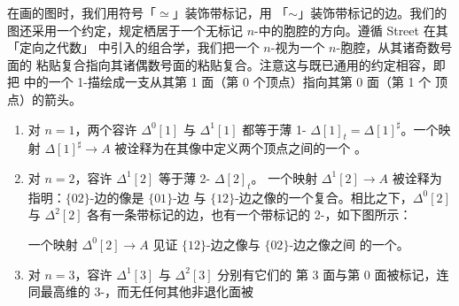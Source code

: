 在画\trMarkedSimplicialSet{}的图时，我们用符号「$\simeq$」装饰带标记\trSimplex{}，用
「$\sim$」装饰带标记的边。我们的图还采用一个约定，规定栖居于一个无标记
$n$-\trSimplex{}中的胞腔的方向。遵循 Street 在其「定向\trSimplex{}之代数」\cite{bib120}
中引入的组合学，我们把一个 $n$-\trSimplex{}视为一个 $n$-胞腔，从其诸奇数号面的
粘贴复合指向其诸偶数号面的粘贴复合。注意这与既已通用的约定相容，即把\trSimplicialSet{}%
中的一个 1-\trSimplex{}描绘成一支从其第 1 面（第 0 个顶点）指向其第 0 面（第 1 个
顶点）的箭头。

\begin{example}\label{exa:admissible-low-dimensions}
\begin{enumerate}[label=(\roman*)]
\item 对 $n=1$，两个容许\trSimplex{} $\Delta^{0}[1]$ 与 $\Delta^{1}[1]$ 都等于薄
  1-\trSimplex{} $\Delta[1]_{t}=\Delta[1]^{\sharp}$。一个映射
  $\Delta[1]^{\sharp}\to A$ 被诠释为在其像中定义两个顶点之间的一个%
  \trEquivalence。
\item 对 $n=2$，容许\trSimplex{} $\Delta^{1}[2]$ 等于薄 2-\trSimplex{} $\Delta[2]_{t}$。
  一个映射 $\Delta^{1}[2]\to A$ 被诠释为指明：$\{02\}$-边的像是 $\{01\}$-边
  与 $\{12\}$-边之像的一个复合。相比之下，$\Delta^{0}[2]$ 与 $\Delta^{2}[2]$
  各有一条带标记的边，也有一个带标记的 2-\trSimplex{}，如下图所示：
\begin{center}
\qquad
{}
\end{center}
  一个映射 $\Delta^{0}[2]\to A$ 见证 $\{12\}$-边之像与 $\{02\}$-边之像之间
  的一个\trEquivalence。
\item 对 $n=3$，容许\trSimplex{} $\Delta^{1}[3]$ 与 $\Delta^{2}[3]$ 分别有它们的
  第 3 面与第 0 面被标记，连同最高维的 3-\trSimplex{}，而无任何其他非退化面被

\end{enumerate}
\end{example}
